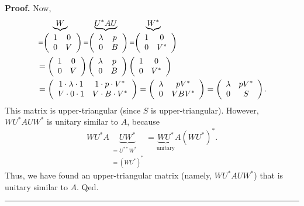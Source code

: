 \documentclass[numbers=enddot,12pt,final,onecolumn,notitlepage]{scrartcl}%
\numberwithin{exer}{subsection}
\theoremstyle{definition}
\newenvironment{proof}[1][Proof]{\noindent\textbf{#1.} }{\ \rule{0.5em}{0.5em}}
\begin{document}
\begin{proof}
Now,%
\begin{align*}
& \underbrace{W}_{=\left(
\begin{array}
[c]{cc}%
1 & 0\\
0 & V
\end{array}
\right)  }\underbrace{U^{\ast}AU}_{=\left(
\begin{array}
[c]{cc}%
\lambda & p\\
0 & B
\end{array}
\right)  }\underbrace{W^{\ast}}_{=\left(
\begin{array}
[c]{cc}%
1 & 0\\
0 & V^{\ast}%
\end{array}
\right)  }\\
& =\left(
\begin{array}
[c]{cc}%
1 & 0\\
0 & V
\end{array}
\right)  \left(
\begin{array}
[c]{cc}%
\lambda & p\\
0 & B
\end{array}
\right)  \left(
\begin{array}
[c]{cc}%
1 & 0\\
0 & V^{\ast}%
\end{array}
\right)  \\
& =\left(
\begin{array}
[c]{cc}%
1\cdot\lambda\cdot1 & 1\cdot p\cdot V^{\ast}\\
V\cdot0\cdot1 & V\cdot B\cdot V^{\ast}%
\end{array}
\right)  =\left(
\begin{array}
[c]{cc}%
\lambda & pV^{\ast}\\
0 & VBV^{\ast}%
\end{array}
\right)  =\left(
\begin{array}
[c]{cc}%
\lambda & pV^{\ast}\\
0 & S
\end{array}
\right)  .
\end{align*}
This matrix is upper-triangular (since $S$ is upper-triangular). However,
$WU^{\ast}AUW^{\ast}$ is unitary similar to $A$, because%
\[
WU^{\ast}A\underbrace{UW^{\ast}}_{\substack{=U^{\ast\ast}W^{\ast}\\=\left(
WU^{\ast}\right)  ^{\ast}}}=\underbrace{WU^{\ast}}_{\text{unitary}}A\left(
WU^{\ast}\right)  ^{\ast}.
\]
Thus, we have found an upper-triangular matrix (namely, $WU^{\ast}AUW^{\ast}$)
that is unitary similar to $A$. Qed.
\end{proof}
\end{document}
